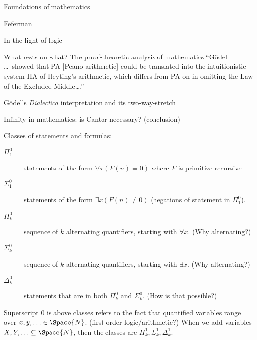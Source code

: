 \begin{plSection}{Foundations of mathematics}
\begin{plSection}{Feferman}
\begin{plSection}{In the light of logic}
\begin{plSection}{What rests on what? The proof-theoretic analysis of mathematics}
``G\"{o}del \ldots\ showed that PA [Peano arithmetic]
could be translated into the intuitionistic system HA of
Heyting's arithmetic,
which differs from PA on in omitting the 
Law of the Excluded Middle{\ldots}.''~\cite[190]{Feferman:1998:LightOfLogic}

\end{plSection}%
\begin{plSection}{G\"{o}del's \textit{Dialectica} interpretation and its two-way-stretch}
\label{sec:Godels_Dialectica_interpretation}

\cite[ch~11 ``G\"{o}del's \textit{Dialectica} interpretation and its
two-way-stretch'']{Feferman:1998:LightOfLogic}

\end{plSection}%
\begin{plSection}{Infinity in mathematics: is Cantor necessary? (conclusion)}
\label{sec:Cantor_necessary_conclusion}

\cite[ch~12 ``Infinity in mathematics: is Cantor necessary? (conclusion)'']
{Feferman:1998:LightOfLogic}

Classes of statements and formulas:
\begin{description}
\item[$\Pi^0_1$] statements of the form
$\forall x (F(n) = 0)$ where $F$ is primitive recursive.
\item[$\Sigma^0_1$] statements of the form
$\exists x (F(n) \neq 0)$ (negations of statement in $\Pi^0_1$).
\item[$\Pi^0_k$] sequence of $k$ alternating quantifiers,
starting with $\forall x$.
\textsf{(Why alternating?)}
\item[$\Sigma^0_k$] sequence of $k$ alternating quantifiers,
starting with $\exists x$.
\textsf{(Why alternating?)}
\item[$\Delta^0_k$] statements that are in both $\Pi^0_k$
and $\Sigma^0_k$. 
\textsf{(How is that possible?)}
\end{description}
Superscript $0$ is above classes refers to the fact that
quantified variables range over $x,y,\ldots \in \Space{N}$.
\textsf{(first order logic/arithmetic?)}
When we add variables $X,Y,\ldots \subseteq \Space{N}$,
then the classes are $\Pi^1_k, \Sigma^1_k, \Delta^1_k$.


\end{plSection}
\end{plSection}
\end{plSection}
\end{plSection}
